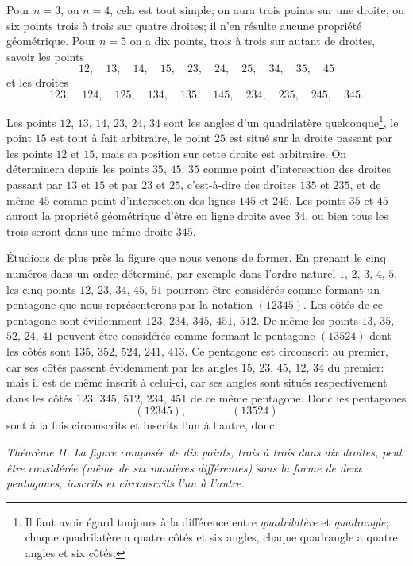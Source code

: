 \documentclass[12pt,a4paper]{article}
\theoremstyle{plain}
\begin{document}
Pour $n = 3$, ou $n = 4$, cela est tout simple; on aura trois points sur une droite, ou six points trois \`a trois sur quatre droites; il n'en r\'esulte aucune propri\'et\'e g\'eom\'etrique. Pour $n = 5$ on a dix points, trois \`a trois sur autant de droites, savoir les points
\[
12,\quad 13,\quad 14,\quad 15,\quad 23,\quad 24,\quad 25,\quad 34,\quad 35,\quad 45
\]
et les droites
\[
123,\quad 124,\quad 125,\quad 134,\quad 135,\quad 145,\quad 234,\quad 235,\quad 245,\quad 345.
\]

Les points $12$, $13$, $14$, $23$, $24$, $34$ sont les angles d'un quadrilat\`ere quelconque\footnote{Il faut avoir \'egard toujours \`a la diff\'erence entre \textit{quadrilat\`ere} et \textit{quadrangle}; chaque quadrilat\`ere a quatre c\^ot\'es et six angles, chaque quadrangle a quatre angles et six c\^ot\'es.}, le point $15$ est tout \`a fait arbitraire, le point $25$ est situ\'e sur la droite passant par les points $12$ et $15$, mais sa position sur cette droite est arbitraire. On d\'eterminera depuis les points $35$, $45$; $35$ comme point d'intersection des droites passant par $13$ et $15$ et par $23$ et $25$, c'est-\`a-dire des droites $135$ et $235$, et de m\^eme $45$ comme point d'intersection des lignes $145$ et $245$. Les points $35$ et $45$ auront la propri\'et\'e g\'eom\'etrique d'\^etre en ligne droite avec $34$, ou bien tous les trois seront dans une m\^eme droite $345$.

\'Etudions de plus pr\`es la figure que nous venons de former. En prenant le cinq num\'eros dans un ordre d\'etermin\'e, par exemple dans l'ordre naturel $1$, $2$, $3$, $4$, $5$, les cinq points $12$, $23$, $34$, $45$, $51$ pourront \^etre consid\'er\'es comme formant un pentagone que nous repr\'esenterons par la notation $(12345)$. Les c\^ot\'es de ce pentagone sont \'evidemment $123$, $234$, $345$, $451$, $512$. De m\^eme les points $13$, $35$, $52$, $24$, $41$ peuvent \^etre consid\'er\'es comme formant le pentagone $(13524)$ dont les c\^ot\'es sont $135$, $352$, $524$, $241$, $413$. Ce pentagone est circonscrit au premier, car ses c\^ot\'es passent \'evidemment par les angles $15$, $23$, $45$, $12$, $34$ du premier: mais il est de m\^eme inscrit \`a celui-ci, car ses angles sont situ\'es respectivement dans les c\^ot\'es $123$, $345$, $512$, $234$, $451$ de ce m\^eme pentagone. Donc les pentagones
\[
(12345),\qquad\qquad (13524)
\]
sont \`a la fois circonscrits et inscrits l'un \`a l'autre, donc:

\smallskip
\textit{Th\'eor\`eme II. La figure compos\'ee de dix points, trois \`a trois dans dix droites, peut \^etre consid\'er\'ee (m\^eme de six mani\`eres diff\'erentes) sous la forme de deux pentagones, inscrits et circonscrits l'un \`a l'autre.}
\smallskip
\end{document}
